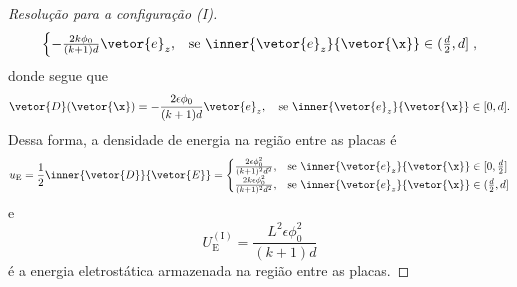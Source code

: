 \begin{proof}[Resolução para a configuração (I)]
\begin{equation*}
\begin{cases}
            -\frac{2k\phi_0}{(k+1)d}\vetor{e}_z,&\text{se }\inner{\vetor{e}_z}{\vetor{\x}}\in (\frac{d}{2},d]
        \end{cases},
    \end{equation*}
    donde segue que
    \begin{equation*}
        \vetor{D}(\vetor{\x}) = -\frac{2 \epsilon \phi_0}{(k + 1)d}\vetor{e}_z,\quad\text{se }\inner{\vetor{e}_z}{\vetor{\x}} \in [0, d].
    \end{equation*}
    Dessa forma, a densidade de energia na região entre as placas é
    \begin{equation*}
        u_\mathrm{E} = \frac12 \inner{\vetor{D}}{\vetor{E}} = \begin{cases}
            \frac{2\epsilon \phi_0^2}{(k+1)^2d^2},&\text{se }\inner{\vetor{e}_z}{\vetor{\x}}\in [0,\frac{d}{2}]\\
            \frac{2k \epsilon \phi_0^2}{(k+1)^2d^2},&\text{se }\inner{\vetor{e}_z}{\vetor{\x}}\in (\frac{d}{2},d]
        \end{cases}
    \end{equation*}
    e
    \begin{equation*}
        U_\mathrm{E}^{\mathrm{(I)}} = \frac{L^2 \epsilon \phi_0^2}{(k+1)d}
    \end{equation*}
    é a energia eletrostática armazenada na região entre as placas.
\end{proof}

